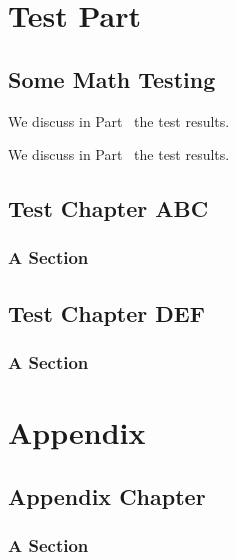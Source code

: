 \documentclass[11pt,paper=a5,footinclude=true,headinclude=true]{scrbook} %
\begin{document}

    \tableofcontents


    \cleardoublepage\part{Test Part}\label{part:testpart}
    \chapter{Some Math Testing}
    We discuss in Part~\ref{part:testpart} the test results.
		
    We discuss in Part~\textsc{\ref{part:testpart}} the test results.
    \lipsum[1]

    \chapter{Test Chapter ABC}
    \lipsum[1]

    \section{A Section}
    \lipsum[1]

    \chapter{Test Chapter DEF}
    \lipsum[1]

    \section{A Section}
    \lipsum[1]

%   

    \appendix
    \cleardoublepage\part{Appendix}
    \chapter{Appendix Chapter}
    \lipsum[1]

    \section{A Section}
    \lipsum[1]
\end{document}
